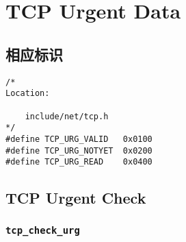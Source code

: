 \section{TCP Urgent Data}
        \subsection{相应标识}
\begin{verbatim}
/*
Location:

    include/net/tcp.h
*/
#define TCP_URG_VALID   0x0100
#define TCP_URG_NOTYET  0x0200
#define TCP_URG_READ    0x0400
\end{verbatim}
		\subsection{TCP Urgent Check}
        	\subsubsection{\texttt{tcp_check_urg}}
            	\label{TCPUrgent:tcp_check_urg}

